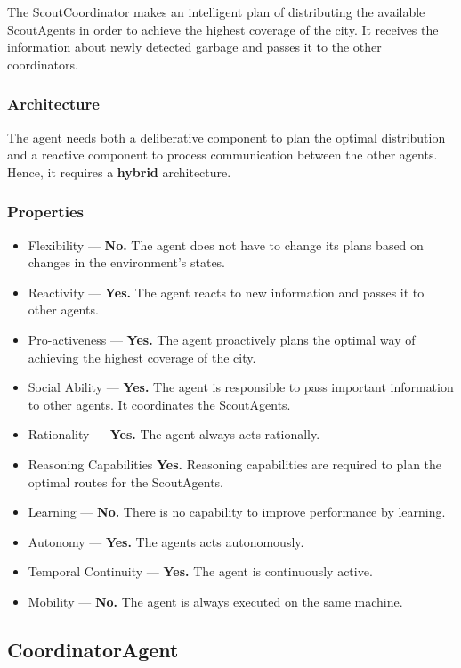 The ScoutCoordinator makes an intelligent plan of distributing the available ScoutAgents in order to achieve the highest coverage of the city. It receives the information about newly detected garbage and passes it to the other coordinators.

\subsubsection*{Architecture}

The agent needs both a deliberative component to plan the optimal distribution and a reactive component to process communication between the other agents. Hence, it requires a \textbf{hybrid} architecture.

\subsubsection*{Properties}

\begin{itemize}
	\item Flexibility — \textbf{No.} The agent does not have to change its plans based on changes in the environment's states.
	\item Reactivity — \textbf{Yes.} The agent reacts to new information and passes it to other agents.
	\item Pro-activeness — \textbf{Yes.} The agent proactively plans the optimal way of achieving the highest coverage of the city.
	\item Social Ability — \textbf{Yes.} The agent is responsible to pass important information to other agents. It coordinates the ScoutAgents.
	\item Rationality — \textbf{Yes.} The agent always acts rationally.
	\item Reasoning Capabilities \textbf{Yes.} Reasoning capabilities are required to plan the optimal routes for the ScoutAgents.
	\item Learning — \textbf{No.} There is no capability to improve performance by learning.
	\item Autonomy — \textbf{Yes.} The agents acts autonomously.
	\item Temporal Continuity — \textbf{Yes.} The agent is continuously active.
	\item Mobility — \textbf{No.} The agent is always executed on the same machine.
\end{itemize}

\subsection{CoordinatorAgent}

